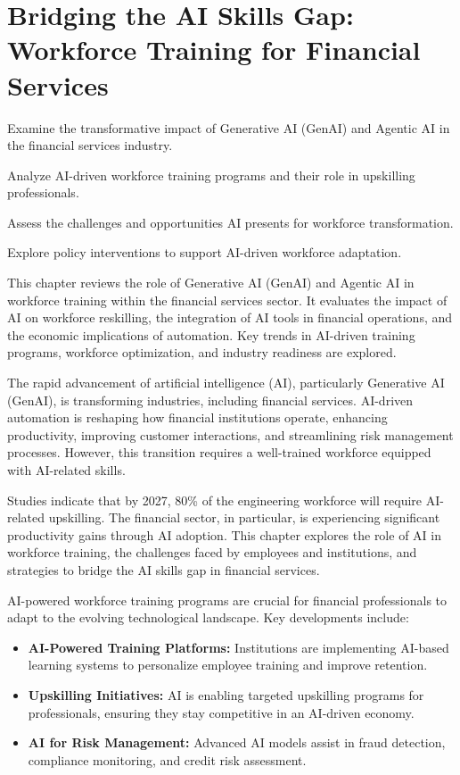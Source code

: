 \documentclass[a4paper,headinclude=on,footinclude=on,12pt,oneside]{scrbook}
\begin{document}
\chapter{Bridging the AI Skills Gap: Workforce Training for Financial Services}

\begin{arrows}
	\item Examine the transformative impact of Generative AI (GenAI) and Agentic AI in the financial services industry.
	\item Analyze AI-driven workforce training programs and their role in upskilling professionals.
	\item Assess the challenges and opportunities AI presents for workforce transformation.
	\item Explore policy interventions to support AI-driven workforce adaptation.
\end{arrows}

This chapter reviews the role of Generative AI (GenAI) and Agentic AI in workforce training within the financial services sector. It evaluates the impact of AI on workforce reskilling, the integration of AI tools in financial operations, and the economic implications of automation. Key trends in AI-driven training programs, workforce optimization, and industry readiness are explored.


The rapid advancement of artificial intelligence (AI), particularly Generative AI (GenAI), is transforming industries, including financial services. AI-driven automation is reshaping how financial institutions operate, enhancing productivity, improving customer interactions, and streamlining risk management processes. However, this transition requires a well-trained workforce equipped with AI-related skills.

Studies indicate that by 2027, 80\% of the engineering workforce will require AI-related upskilling. The financial sector, in particular, is experiencing significant productivity gains through AI adoption. This chapter explores the role of AI in workforce training, the challenges faced by employees and institutions, and strategies to bridge the AI skills gap in financial services.


AI-powered workforce training programs are crucial for financial professionals to adapt to the evolving technological landscape. Key developments include:
\begin{itemize}
	\item \textbf{AI-Powered Training Platforms:} Institutions are implementing AI-based learning systems to personalize employee training and improve retention.
	\item \textbf{Upskilling Initiatives:} AI is enabling targeted upskilling programs for professionals, ensuring they stay competitive in an AI-driven economy.
	\item \textbf{AI for Risk Management:} Advanced AI models assist in fraud detection, compliance monitoring, and credit risk assessment.
\end{itemize}
\end{document}
